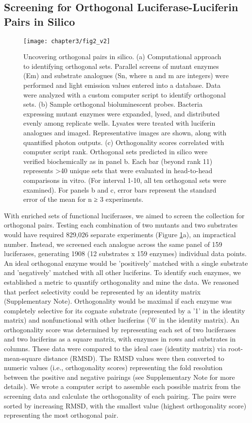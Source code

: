 \subsection*{Screening for Orthogonal Luciferase-Luciferin Pairs in Silico}
\begin{figure}[htb]
\texttt{[image: chapter3/fig2\_v2]}
\centering
\caption[Uncovering orthogonal pairs in silico]{Uncovering orthogonal pairs in silico. (a) Computational approach to identifying orthogonal sets. Parallel screens of mutant enzymes (Em) and substrate analogues (Sn, where n and m are integers) were performed and light emission values entered into a database. Data were analyzed with a custom computer script to identify orthogonal sets. (b) Sample orthogonal bioluminescent probes. Bacteria expressing mutant enzymes were expanded, lysed, and distributed evenly among replicate wells. Lysates were treated with luciferin analogues and imaged. Representative images are shown, along with quantified photon outputs. (c) Orthogonality scores correlated with computer script rank. Orthogonal sets predicted in silico were verified biochemically as in panel b. Each bar (beyond rank 11) represents >40 unique sets that were evaluated in head-to-head comparisons in vitro. (For interval 1-10, all ten orthogonal sets were examined). For panels b and c, error bars represent the standard error of the mean for n ≥ 3 experiments.}
  \label{fig:inSilico}
\end{figure}
With enriched sets of functional luciferases, we aimed to screen the collection for orthogonal pairs. Testing each combination of two mutants and two substrates would have required 829,026 separate experiments (Figure \ref{fig:inSilico}a), an impractical number. Instead, we screened each analogue across the same panel of 159 luciferases, generating 1908 (12 substrates x 159 enzymes) individual data points.
An ideal orthogonal enzyme would be 'positively' matched with a single substrate and 'negatively' matched with all other luciferins. To identify such enzymes, we established a metric to quantify orthogonality and mine the data. We reasoned that perfect selectivity could be represented by an identity matrix
(Supplementary Note). Orthogonality would be maximal if each enzyme was completely selective for its cognate substrate (represented by a '1' in the identity matrix) and nonfunctional with other luciferins ('0' in the identity matrix). An orthogonality score was determined by representing each set of two luciferases and two luciferins as a square matrix, with enzymes in rows and substrates in columns. These data were compared to the ideal case (identity matrix) via root-mean-square distance (RMSD). The RMSD values were then converted to numeric values (i.e., orthogonality scores) representing the fold resolution between the positive and negative pairings (see Supplementary Note for more details). We wrote a computer script to assemble each possible matrix from the screening data and calculate the orthogonality of each pairing. The pairs were sorted by increasing RMSD, with the smallest value (highest orthogonality score) representing the most orthogonal pair.

